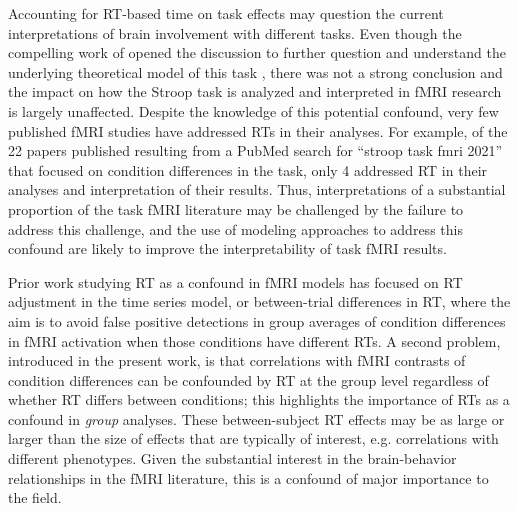 \documentclass[titlepage,12pt] {article}
\begin{document}
Accounting for RT-based time on task effects may question the current interpretations of brain involvement with different tasks.  Even though the compelling work of \citet{grinband_dorsal_2011} opened the discussion to further question and understand the underlying theoretical model of this task \citep{yeung_errors_2011, brown_medial_2011, alexander_medial_2011, brown_medial_2011}, there was not a strong conclusion and the impact on how the Stroop task is analyzed and interpreted in fMRI research is largely unaffected. Despite the knowledge of this potential confound, very few published fMRI studies have addressed RTs in their analyses.  For example, of the 22 papers published resulting from a PubMed search for ``stroop task fmri 2021'' that focused on condition differences in the task, only 4 addressed RT in their analyses and interpretation of their results. Thus, interpretations of a substantial proportion of the task fMRI literature may be challenged by the failure to address this challenge, and the use of modeling approaches to address this confound are likely to improve the interpretability of task fMRI results.

Prior work studying RT as a confound in fMRI models has focused on RT adjustment in the time series model, or between-trial differences in RT, where the aim is to avoid false positive detections in group averages of condition differences in fMRI activation when those conditions have different RTs.  A second problem, introduced in the present work, is that correlations with fMRI contrasts of condition differences can be confounded by RT at the group level regardless of whether RT differs between conditions; this highlights the importance of RTs as a confound in \emph{group} analyses.  These between-subject RT effects may be as large or larger than the size of effects that are typically of interest, e.g. correlations with different phenotypes.  Given the substantial interest in the brain-behavior relationships in the fMRI literature, this is a confound of major importance to the field.
\end{document}
